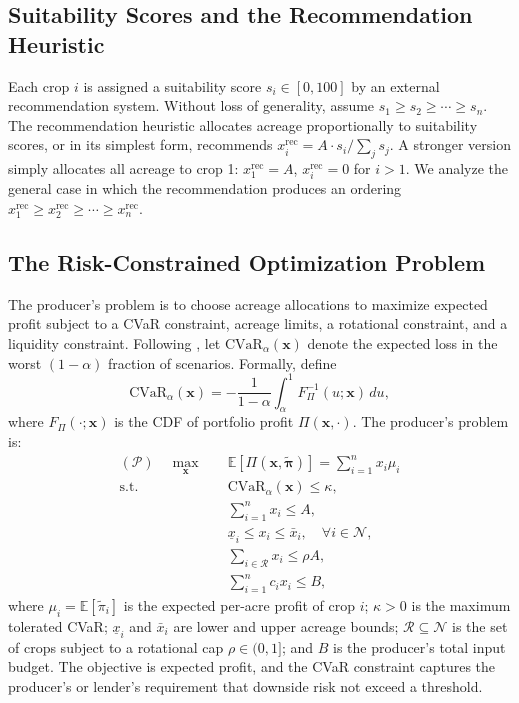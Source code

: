 \documentclass[12pt,review,authoryear]{elsarticle}
\numberwithin{equation}{section}
\begin{document}
\subsection{Suitability Scores and the Recommendation Heuristic}

Each crop $i$ is assigned a suitability score $s_i \in [0, 100]$ by an
external recommendation system.  Without loss of generality, assume
$s_1 \geq s_2 \geq \cdots \geq s_n$.  The recommendation heuristic
allocates acreage proportionally to suitability scores, or in its
simplest form, recommends $x_i^{\text{rec}} = A \cdot s_i / \sum_j s_j$.
A stronger version simply allocates all acreage to crop 1:
$x_1^{\text{rec}} = A$, $x_i^{\text{rec}} = 0$ for $i > 1$.  We
analyze the general case in which the recommendation produces an ordering
$x_1^{\text{rec}} \geq x_2^{\text{rec}} \geq \cdots \geq x_n^{\text{rec}}$.

\subsection{The Risk-Constrained Optimization Problem}

The producer's problem is to choose acreage allocations to maximize
expected profit subject to a CVaR constraint, acreage limits, a
rotational constraint, and a liquidity constraint.  Following
\citet{RockafellarUryasev2000}, let $\text{CVaR}_\alpha(\mathbf{x})$
denote the expected loss in the worst $(1-\alpha)$ fraction of scenarios.
Formally, define
\begin{equation}
\text{CVaR}_\alpha(\mathbf{x}) = -\frac{1}{1-\alpha}
\int_{\alpha}^{1} F_{\Pi}^{-1}(u;\mathbf{x})\, du,
\label{eq:cvar_def}
\end{equation}
where $F_{\Pi}(\cdot;\mathbf{x})$ is the CDF of portfolio profit
$\Pi(\mathbf{x},\cdot)$.  The producer's problem is:
\begin{align}
(\mathcal{P})\quad
\max_{\mathbf{x}} \quad & \mathbb{E}[\Pi(\mathbf{x},\tilde{\boldsymbol{\pi}})]
= \sum_{i=1}^{n} x_i \mu_i
\label{eq:obj} \\
\text{s.t.} \quad
& \text{CVaR}_\alpha(\mathbf{x}) \leq \kappa,
\label{eq:cvar_con} \\
& \sum_{i=1}^{n} x_i \leq A,
\label{eq:land} \\
& \underline{x}_i \leq x_i \leq \bar{x}_i, \quad \forall i \in \mathcal{N},
\label{eq:bounds} \\
& \sum_{i \in \mathcal{R}} x_i \leq \rho A,
\label{eq:rotation} \\
& \sum_{i=1}^{n} c_i x_i \leq B,
\label{eq:liquidity}
\end{align}
where $\mu_i = \mathbb{E}[\tilde{\pi}_i]$ is the expected per-acre profit
of crop $i$; $\kappa > 0$ is the maximum tolerated CVaR; $\underline{x}_i$
and $\bar{x}_i$ are lower and upper acreage bounds; $\mathcal{R} \subseteq \mathcal{N}$
is the set of crops subject to a rotational cap $\rho \in (0,1]$; and
$B$ is the producer's total input budget.  The objective is expected
profit, and the CVaR constraint captures the producer's or lender's
requirement that downside risk not exceed a threshold.
\end{document}
